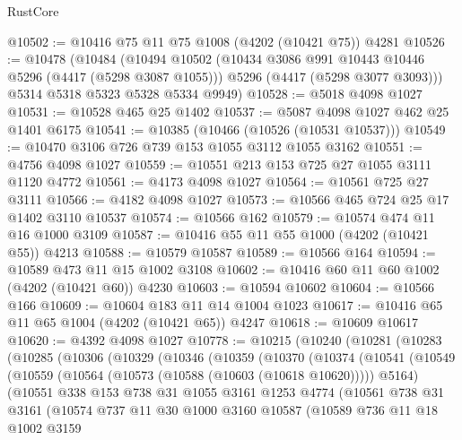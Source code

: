 \begin{lexlean}{RustCore}
\begin{coremodule}
@10502 := @10416 @75 @11 @75 @1008 (@4202 (@10421 @75)) @4281
@10526 := @10478
    (@10484
      (@10494
        @10502
        (@10434 @3086 @991 @10443 @10446 @5296 (@4417 (@5298 @3087 @1055)))
        @5296
        (@4417 (@5298 @3077 @3093)))
      @5314
      @5318
      @5323
      @5328
      @5334
      @9949)
@10528 := @5018 @4098 @1027
@10531 := @10528 @465 @25 @1402
@10537 := @5087 @4098 @1027 @462 @25 @1401 @6175
@10541 := @10385 (@10466 (@10526 (@10531 @10537)))
@10549 := @10470 @3106 @726 @739 @153 @1055 @3112 @1055 @3162
@10551 := @4756 @4098 @1027
@10559 := @10551 @213 @153 @725 @27 @1055 @3111 @1120 @4772
@10561 := @4173 @4098 @1027
@10564 := @10561 @725 @27 @3111
@10566 := @4182 @4098 @1027
@10573 := @10566 @465 @724 @25 @17 @1402 @3110 @10537
@10574 := @10566 @162
@10579 := @10574 @474 @11 @16 @1000 @3109
@10587 := @10416 @55 @11 @55 @1000 (@4202 (@10421 @55)) @4213
@10588 := @10579 @10587
@10589 := @10566 @164
@10594 := @10589 @473 @11 @15 @1002 @3108
@10602 := @10416 @60 @11 @60 @1002 (@4202 (@10421 @60)) @4230
@10603 := @10594 @10602
@10604 := @10566 @166
@10609 := @10604 @183 @11 @14 @1004 @1023
@10617 := @10416 @65 @11 @65 @1004 (@4202 (@10421 @65)) @4247
@10618 := @10609 @10617
@10620 := @4392 @4098 @1027
@10778 := @10215
    (@10240
      (@10281
        (@10283
          (@10285
            (@10306
              (@10329
                (@10346
                  (@10359
                    (@10370
                      (@10374
                        (@10541
                          (@10549
                            (@10559 (@10564 (@10573 (@10588 (@10603 (@10618 @10620))))) @5164)
                            (@10551
                              @338
                              @153
                              @738
                              @31
                              @1055
                              @3161
                              @1253
                              @4774
                              (@10561
                                @738
                                @31
                                @3161
                                (@10574
                                  @737
                                  @11
                                  @30
                                  @1000
                                  @3160
                                  @10587
                                  (@10589
                                    @736
                                    @11
                                    @18
                                    @1002
                                    @3159

\end{coremodule}
\end{lexlean}
